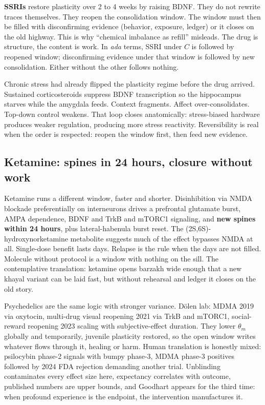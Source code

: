 \textbf{SSRIs} restore plasticity over 2 to 4 weeks by raising BDNF. They do not rewrite traces themselves. They reopen the consolidation window. The window must then be filled with disconfirming evidence (behavior, exposure, ledger) or it closes on the old highway. This is why ``chemical imbalance as refill'' misleads. The drug is structure, the content is work. In \textit{ada} terms, SSRI under $C$ is followed by reopened window; disconfirming evidence under that window is followed by new consolidation. Either without the other follows nothing.

Chronic stress had already flipped the plasticity regime before the drug arrived. Sustained corticosteroids suppress BDNF transcription so the hippocampus starves while the amygdala feeds. Context fragments. Affect over-consolidates. Top-down control weakens. That loop closes anatomically: stress-biased hardware produces weaker regulation, producing more stress reactivity. Reversibility is real when the order is respected: reopen the window first, then feed new evidence.

\subsection{Ketamine: spines in 24 hours, closure without work}

Ketamine runs a different window, faster and shorter. Disinhibition via NMDA blockade preferentially on interneurons drives a prefrontal glutamate burst, AMPA dependence, BDNF and TrkB and mTORC1 signaling, and \textbf{new spines within 24 hours}, plus lateral-habenula burst reset. The (2S,6S)-hydroxynorketamine metabolite suggests much of the effect bypasses NMDA at all. Single-dose benefit lasts days. Relapse is the rule when the days are not filled. Molecule without protocol is a window with nothing on the sill. The contemplative translation: ketamine opens barzakh wide enough that a new khayal variant can be laid fast, but without rehearsal and ledger it closes on the old story.

Psychedelics are the same logic with stronger variance. D\"olen lab: MDMA 2019 via oxytocin, multi-drug visual reopening 2021 via TrkB and mTORC1, social-reward reopening 2023 scaling with subjective-effect duration. They lower $\theta_m$ globally and temporarily, juvenile plasticity restored, so the open window writes whatever flows through it, healing or harm. Human translation is honestly mixed: psilocybin phase-2 signals with bumpy phase-3, MDMA phase-3 positives followed by 2024 FDA rejection demanding another trial. Unblinding contaminates every effect size here, expectancy correlates with outcome, published numbers are upper bounds, and Goodhart appears for the third time: when profound experience is the endpoint, the intervention manufactures it.

